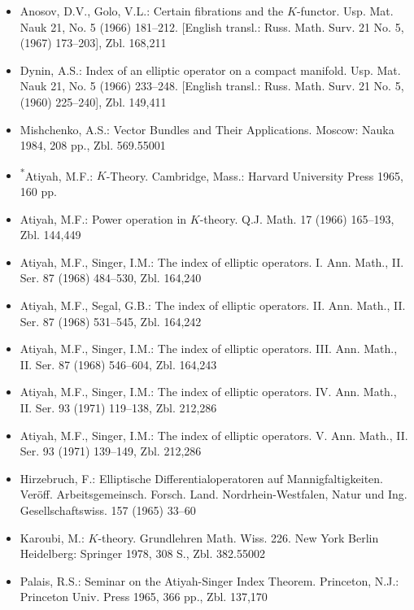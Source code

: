 \begin{itemize}
\item Anosov, D.V., Golo, V.L.: Certain fibrations and the $K$-functor. Usp. Mat. Nauk 21, No. 5 (1966) 181--212. [English transl.: Russ. Math. Surv. 21 No. 5, (1967) 173--203], Zbl. 168,211
\item Dynin, A.S.: Index of an elliptic operator on a compact manifold. Usp. Mat. Nauk 21, No. 5 (1966) 233--248. [English transl.: Russ. Math. Surv. 21 No. 5, (1960) 225--240], Zbl. 149,411
\item Mishchenko, A.S.: Vector Bundles and Their Applications. Moscow: Nauka 1984, 208 pp., Zbl. 569.55001
\item \textsuperscript{*}Atiyah, M.F.: $K$-Theory. Cambridge, Mass.: Harvard University Press 1965, 160 pp.
\item Atiyah, M.F.: Power operation in $K$-theory. Q.J. Math. 17 (1966) 165--193, Zbl. 144,449
\item Atiyah, M.F., Singer, I.M.: The index of elliptic operators. I. Ann. Math., II. Ser. 87 (1968) 484--530, Zbl. 164,240
\item Atiyah, M.F., Segal, G.B.: The index of elliptic operators. II. Ann. Math., II. Ser. 87 (1968) 531--545, Zbl. 164,242
\item Atiyah, M.F., Singer, I.M.: The index of elliptic operators. III. Ann. Math., II. Ser. 87 (1968) 546--604, Zbl. 164,243
\item Atiyah, M.F., Singer, I.M.: The index of elliptic operators. IV. Ann. Math., II. Ser. 93 (1971) 119--138, Zbl. 212,286
\item Atiyah, M.F., Singer, I.M.: The index of elliptic operators. V. Ann. Math., II. Ser. 93 (1971) 139--149, Zbl. 212,286
\item Hirzebruch, F.: Elliptische Differentialoperatoren auf Mannigfaltigkeiten. Veröff. Arbeitsgemeinsch. Forsch. Land. Nordrhein-Westfalen, Natur und Ing. Gesellschaftswiss. 157 (1965) 33--60
\item Karoubi, M.: $K$-theory. Grundlehren Math. Wiss. 226. New York Berlin Heidelberg: Springer 1978, 308 S., Zbl. 382.55002
\item Palais, R.S.: Seminar on the Atiyah-Singer Index Theorem. Princeton, N.J.: Princeton Univ. Press 1965, 366 pp., Zbl. 137,170
\end{itemize}


